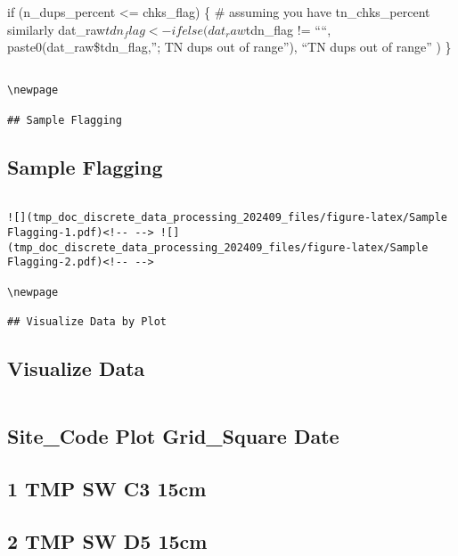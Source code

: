 \documentclass[
]{article}
\begin{document}
if (n\_dups\_percent \textless= chks\_flag) \{ \# assuming you have
tn\_chks\_percent similarly
dat\_raw\(tdn_flag <- ifelse(  dat_raw\)tdn\_flag != ````,
paste0(dat\_raw\$tdn\_flag,''; TN dups out of range''), ``TN dups out of
range'' ) \}

\begin{verbatim}

\newpage

## Sample Flagging   
\end{verbatim}

\hypertarget{sample-flagging}{%
\subsection{Sample Flagging}\label{sample-flagging}}

\begin{verbatim}

![](tmp_doc_discrete_data_processing_202409_files/figure-latex/Sample Flagging-1.pdf)<!-- --> ![](tmp_doc_discrete_data_processing_202409_files/figure-latex/Sample Flagging-2.pdf)<!-- --> 

\newpage

## Visualize Data by Plot   
\end{verbatim}

\hypertarget{visualize-data}{%
\subsection{Visualize Data}\label{visualize-data}}

\begin{verbatim}
\end{verbatim}

\hypertarget{site_code-plot-grid_square-date}{%
\subsection{Site\_Code Plot Grid\_Square
Date}\label{site_code-plot-grid_square-date}}

\hypertarget{tmp-sw-c3-15cm}{%
\subsection{1 TMP SW C3 15cm}\label{tmp-sw-c3-15cm}}

\hypertarget{tmp-sw-d5-15cm}{%
\subsection{2 TMP SW D5 15cm}\label{tmp-sw-d5-15cm}}
\end{document}
